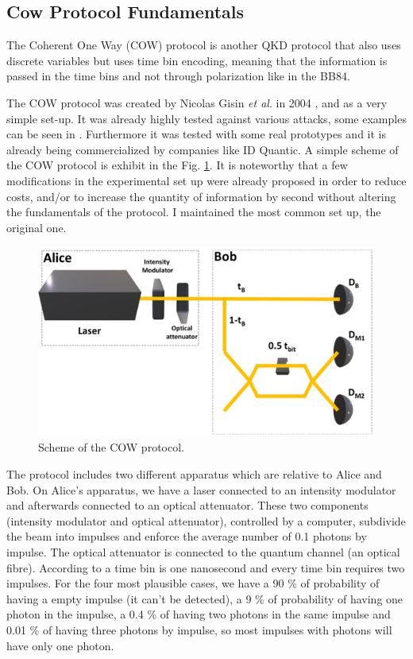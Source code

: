 \begin{refsection}
\subsection{Cow Protocol Fundamentals}

The Coherent One Way (COW) protocol is another QKD protocol that also uses discrete variables but uses time bin encoding, meaning that the information is passed in the time bins and not through polarization like in the BB84.

The COW protocol was created by Nicolas Gisin \textit{et al}. in 2004 \cite{gisin2004towards}, and as a very simple set-up. It was already highly tested against various attacks, some examples can be seen in \cite{branciard2006zero}. Furthermore it was tested with some real prototypes \cite{stucki2009continuous} and it is already being commercialized by companies like ID Quantic. A simple scheme of the COW protocol is exhibit in the Fig. \ref{fig:Scheme}. It is noteworthy that a few modifications in the experimental set up were already proposed \cite{roberts2017modulator} in order to reduce costs, and/or to increase the quantity of information by second without altering the fundamentals of the protocol. I maintained the most common set up, the original one.

\begin{figure}[hbt!]
\centering
\includegraphics[width=1\linewidth]{./sdf/tq_76558_cow_protocol/slides/figures/Full2.pdf}
\caption{Scheme of the COW protocol.}
\label{fig:Scheme}
\end{figure}

The protocol includes two different apparatus which are relative to Alice and Bob. On Alice's apparatus, we have a laser connected to an intensity modulator and afterwards connected to an optical attenuator. These two components (intensity modulator and optical attenuator), controlled by a computer, subdivide the beam into impulses and enforce the average number of 0.1 photons by impulse. The optical attenuator is connected to the quantum channel (an optical fibre). According to \cite{gisin2004towards} a time bin is one nanosecond and every time bin requires two impulses. For the four most plausible cases, we have a 90 \% of probability of having a empty impulse (it can't be detected), a 9 \% of probability of having one photon in the impulse, a 0.4 \% of having two photons in the same impulse and 0.01 \% of having three photons by impulse, so most impulses with photons will have only one photon.


\end{refsection}
